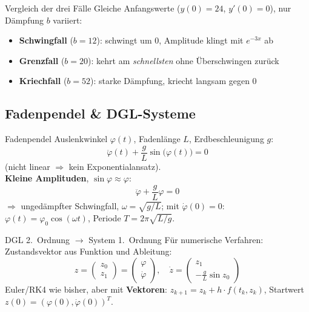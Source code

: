 \documentclass[a4paper, fontsize=7pt]{scrartcl}
\begin{document}
\begin{subbox}{Vergleich der drei Fälle}
Gleiche Anfangswerte ($y(0) = 24$, $y'(0) = 0$), nur Dämpfung $b$
variiert:
\begin{itemize}
    \item \textbf{Schwingfall} ($b = 12$): schwingt um 0, Amplitude
          klingt mit $e^{-3x}$ ab
    \item \textbf{Grenzfall} ($b = 20$): kehrt am \emph{schnellsten}
          ohne Überschwingen zurück
    \item \textbf{Kriechfall} ($b = 52$): starke Dämpfung, kriecht
          langsam gegen 0
\end{itemize}
\end{subbox}

\subsection{Fadenpendel \& DGL-Systeme}

\begin{mainbox}{Fadenpendel}
Auslenkwinkel $\varphi(t)$, Fadenlänge $L$, Erdbeschleunigung $g$:
$$\ddot{\varphi}(t) + \frac{g}{L}\sin\big(\varphi(t)\big) = 0$$
(nicht linear $\Rightarrow$ kein Exponentialansatz).\\
\textbf{Kleine Amplituden}, $\sin\varphi \approx \varphi$:
$$\ddot{\varphi} + \frac{g}{L}\varphi = 0$$
$\Rightarrow$ ungedämpfter Schwingfall, $\omega = \sqrt{g/L}$; mit
$\dot{\varphi}(0) = 0$: $\varphi(t) = \varphi_0\cos(\omega t)$,
Periode $T = 2\pi\sqrt{L/g}$.
\end{mainbox}

\begin{mainbox}{DGL 2.\ Ordnung $\to$ System 1.\ Ordnung}
Für numerische Verfahren: Zustandsvektor aus Funktion und Ableitung:
$$z = \begin{pmatrix} z_0 \\ z_1 \end{pmatrix}
= \begin{pmatrix} \varphi \\ \dot{\varphi} \end{pmatrix},
\quad
\dot{z} = \begin{pmatrix} z_1 \\ -\frac{g}{L}\sin z_0 \end{pmatrix}$$
Euler/RK4 wie bisher, aber mit \textbf{Vektoren}:
$z_{k+1} = z_k + h \cdot f(t_k, z_k)$, Startwert
$z(0) = (\varphi(0), \dot{\varphi}(0))^T$.
\end{mainbox}
\end{document}
